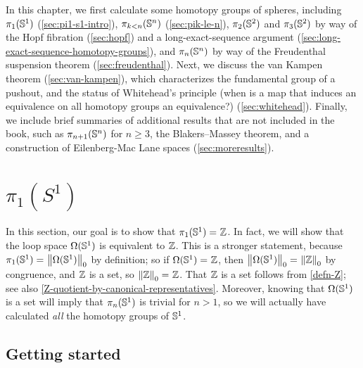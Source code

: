 In this chapter, we first calculate some homotopy groups of spheres,
including $\pi_1(\Sn ^1)$ (\autoref{sec:pi1-s1-intro}), $\pi_{k<n}(\Sn
^n)$ (\autoref{sec:pik-le-n}), $\pi_2(\Sn ^2)$ and $\pi_3(\Sn ^2)$ by
way of the Hopf fibration (\autoref{sec:hopf}) and a long-exact-sequence
argument (\autoref{sec:long-exact-sequence-homotopy-groups}), and
$\pi_n(\Sn ^n)$ by way of the Freudenthal suspension theorem
(\autoref{sec:freudenthal}).  Next, we discuss the van Kampen theorem
(\autoref{sec:van-kampen}), which characterizes the fundamental group of
a pushout, and the status of Whitehead's principle (when is a map that
induces an equivalence on all homotopy groups an equivalence?)
(\autoref{sec:whitehead}).  Finally, we include brief summaries of
additional results that are not included in the book, such as
$\pi_{n+1}(\Sn ^n)$ for $n\ge 3$, the Blakers--Massey theorem, and a
construction of Eilenberg-Mac Lane spaces (\autoref{sec:moreresults}).

\section{\texorpdfstring{$\pi_1(S^1)$}{π₁(S¹)}}
\label{sec:pi1-s1-intro}

In this section, our goal is to show that $\id {\pi_1(\Sn ^1)} {\Z}$.
In fact, we will show that the loop space ${\Omega(\Sn ^1)}$ is equivalent to $\Z$.
This is a stronger statement, because $\id{\pi_1(\Sn ^1)} {\trunc 0 {\Omega(\Sn ^1)}}$ by
definition; so if $\id {\Omega(\Sn ^1)} {\Z}$, then $\id {\trunc
  0 {\Omega(\Sn ^1)}} {\trunc 0 {\Z}}$ by congruence, and
$\Z$ is a set, so $\id {\trunc 0 {\Z}} {\Z}$.
That $\Z$ is a set follows from \autoref{defn-Z}; see also \autoref{Z-quotient-by-canonical-representatives}.
Moreover, knowing that ${\Omega(\Sn ^1)}$ is a set will imply that $\pi_n(\Sn^1)$ is trivial for $n>1$, so we will actually have calculated \emph{all} the homotopy groups of $\Sn^1$.

\subsection{Getting started}
\label{sec:pi1s1-initial-thoughts}

